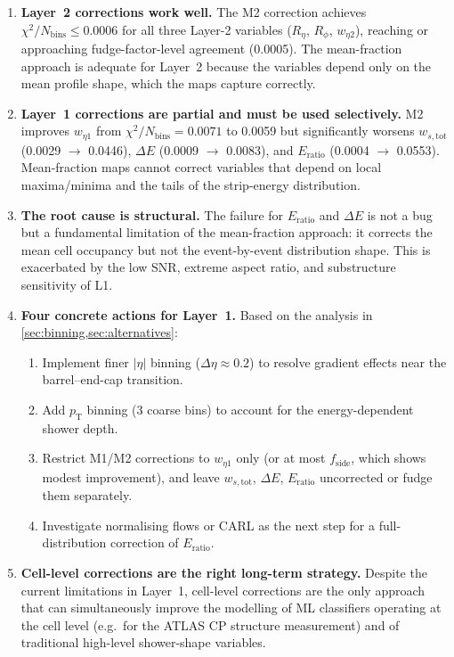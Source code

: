 \documentclass[11pt,a4paper]{article}
\newcommand{\Reta}{R_{\eta}}
\newcommand{\Rphi}{R_{\phi}}
\newcommand{\weta}{w_{\eta 2}}
\newcommand{\wetaone}{w_{\eta 1}}
\newcommand{\wstot}{w_{s,\mathrm{tot}}}
\newcommand{\fside}{f_{\mathrm{side}}}
\newcommand{\dE}{\Delta E}
\newcommand{\Eratio}{E_{\mathrm{ratio}}}
\newcommand{\chisq}{\chi^2/N_\mathrm{bins}}
\begin{document}
\begin{enumerate}[label=\arabic*.]
  \item \textbf{Layer~2 corrections work well.}
        The M2 correction achieves $\chisq \le 0.0006$ for all three
        Layer-2 variables ($\Reta$, $\Rphi$, $\weta$), reaching or
        approaching fudge-factor-level agreement (0.0005).  The
        mean-fraction approach is adequate for Layer~2 because the
        variables depend only on the mean profile shape, which the
        maps capture correctly.

  \item \textbf{Layer~1 corrections are partial and must be used selectively.}
        M2 improves $\wetaone$ from $\chisq = 0.0071$ to 0.0059 but
        significantly worsens $\wstot$ (0.0029 $\to$ 0.0446),
        $\dE$ (0.0009 $\to$ 0.0083), and $\Eratio$ (0.0004 $\to$ 0.0553).
        Mean-fraction maps cannot correct variables that depend on
        local maxima/minima and the tails of the strip-energy
        distribution.

  \item \textbf{The root cause is structural.}
        The failure for $\Eratio$ and $\dE$ is not a bug but a
        fundamental limitation of the mean-fraction approach: it
        corrects the mean cell occupancy but not the event-by-event
        distribution shape.  This is exacerbated by the low SNR,
        extreme aspect ratio, and substructure sensitivity of L1.

  \item \textbf{Four concrete actions for Layer~1.}
        Based on the analysis in \cref{sec:binning,sec:alternatives}:
        \begin{enumerate}[label=(\alph*)]
          \item Implement finer $|\eta|$ binning ($\Delta\eta \approx 0.2$)
                to resolve gradient effects near the barrel--end-cap
                transition.
          \item Add $p_\mathrm{T}$ binning (3 coarse bins) to account
                for the energy-dependent shower depth.
          \item Restrict M1/M2 corrections to $\wetaone$ only (or at
                most $\fside$, which shows modest improvement), and
                leave $\wstot$, $\dE$, $\Eratio$ uncorrected or fudge
                them separately.
          \item Investigate normalising flows or CARL as the next step
                for a full-distribution correction of $\Eratio$.
        \end{enumerate}

  \item \textbf{Cell-level corrections are the right long-term strategy.}
        Despite the current limitations in Layer~1, cell-level
        corrections are the only approach that can simultaneously
        improve the modelling of ML classifiers operating at the cell
        level (e.g.\ for the ATLAS CP structure measurement) and of
        traditional high-level shower-shape variables.
\end{enumerate}
\end{document}
